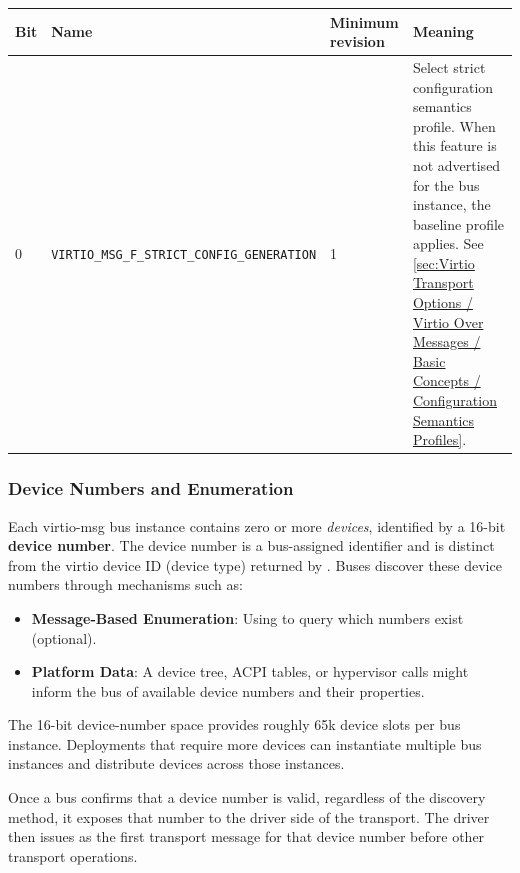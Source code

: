 \begin{tabular}{|l|l|l|p{7cm}|}
\hline
Bit & Name & Minimum revision & Meaning \\
\hline
0 & \texttt{VIRTIO\_MSG\_F\_STRICT\_CONFIG\_GENERATION} & 1 &
Select strict configuration semantics profile. When this feature is not
advertised for the bus instance, the baseline profile applies. See
\ref{sec:Virtio Transport Options / Virtio Over Messages / Basic Concepts / Configuration Semantics Profiles}. \\
\hline
\end{tabular}

\subsubsection{Device Numbers and Enumeration}
\label{sec:Virtio Transport Options / Virtio Over Messages / Basic Concepts /
Device Numbers}

Each virtio-msg bus instance contains zero or more \emph{devices}, identified
by a 16-bit \textbf{device number}. The device number is a bus-assigned
identifier and is distinct from the virtio device ID (device type) returned by
. Buses discover these device numbers through
mechanisms such as:
\begin{itemize}
  \item \textbf{Message-Based Enumeration}: Using  to query
        which numbers exist (optional).
  \item \textbf{Platform Data}: A device tree, ACPI tables, or hypervisor calls
        might inform the bus of available device numbers and their properties.
\end{itemize}

The 16-bit device-number space provides roughly 65k device slots per bus
instance. Deployments that require more devices can instantiate multiple bus
instances and distribute devices across those instances.

Once a bus confirms that a device number is valid, regardless of the discovery
method, it exposes that number to the driver side of the transport. The driver
then issues  as the first transport message for that
device number before other transport operations.

